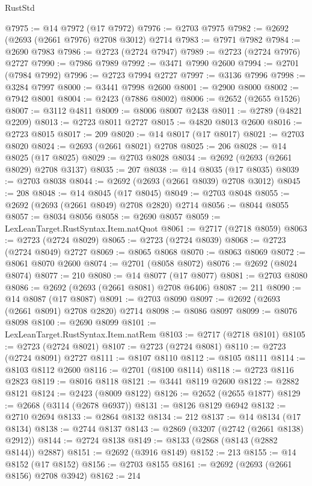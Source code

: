 \begin{lexlean}{RustStd}
\begin{coremodule}
{\begin{coremodule}
{{{{{{{{{{{{{{{{{{{{{{{{{{{{{{{{{{{{{{{@7975 := @14 @7972 (@17 @7972)
@7976 := @2703 @7975
@7982 := @2692 (@2693 (@2661 @7976) @2708 @3012) @2714
@7983 := @7971 @7982
@7984 := @2690 @7983
@7986 := @2723 (@2724 @7947)
@7989 := @2723 (@2724 @7976) @2727
@7990 := @7986 @7989
@7992 := @3471 @7990 @2600
@7994 := @2701 (@7984 @7992)
@7996 := @2723 @7994 @2727
@7997 := @3136 @7996
@7998 := @3284 @7997
@8000 := @3441 @7998 @2600
@8001 := @2900 @8000
@8002 := @7942 @8001
@8004 := @2423 (@7886 @8002)
@8006 := @2652 (@2655 @1526)
@8007 := @3112 @4811
@8009 := @8006 @8007 @2438
@8011 := @2789 (@4821 @2209)
@8013 := @2723 @8011 @2727
@8015 := @4820 @8013 @2600
@8016 := @2723 @8015
@8017 := 209
@8020 := @14 @8017 (@17 @8017)
@8021 := @2703 @8020
@8024 := @2693 (@2661 @8021) @2708
@8025 := 206
@8028 := @14 @8025 (@17 @8025)
@8029 := @2703 @8028
@8034 := @2692 (@2693 (@2661 @8029) @2708 @3137)
@8035 := 207
@8038 := @14 @8035 (@17 @8035)
@8039 := @2703 @8038
@8044 := @2692 (@2693 (@2661 @8039) @2708 @3012)
@8045 := 208
@8048 := @14 @8045 (@17 @8045)
@8049 := @2703 @8048
@8055 := @2692 (@2693 (@2661 @8049) @2708 @2820) @2714
@8056 := @8044 @8055
@8057 := @8034 @8056
@8058 := @2690 @8057
@8059 := LexLeanTarget.RustSyntax.Item.natQuot
@8061 := @2717 (@2718 @8059)
@8063 := @2723 (@2724 @8029)
@8065 := @2723 (@2724 @8039)
@8068 := @2723 (@2724 @8049) @2727
@8069 := @8065 @8068
@8070 := @8063 @8069
@8072 := @8061 @8070 @2600
@8074 := @2701 (@8058 @8072)
@8076 := @2692 (@8024 @8074)
@8077 := 210
@8080 := @14 @8077 (@17 @8077)
@8081 := @2703 @8080
@8086 := @2692 (@2693 (@2661 @8081) @2708 @6406)
@8087 := 211
@8090 := @14 @8087 (@17 @8087)
@8091 := @2703 @8090
@8097 := @2692 (@2693 (@2661 @8091) @2708 @2820) @2714
@8098 := @8086 @8097
@8099 := @8076 @8098
@8100 := @2690 @8099
@8101 := LexLeanTarget.RustSyntax.Item.natRem
@8103 := @2717 (@2718 @8101)
@8105 := @2723 (@2724 @8021)
@8107 := @2723 (@2724 @8081)
@8110 := @2723 (@2724 @8091) @2727
@8111 := @8107 @8110
@8112 := @8105 @8111
@8114 := @8103 @8112 @2600
@8116 := @2701 (@8100 @8114)
@8118 := @2723 @8116 @2823
@8119 := @8016 @8118
@8121 := @3441 @8119 @2600
@8122 := @2882 @8121
@8124 := @2423 (@8009 @8122)
@8126 := @2652 (@2655 @1877)
@8129 := @2668 (@3114 (@2678 @6937))
@8131 := @8126 @8129 @6942
@8132 := @2710 @2694
@8133 := @2864 @8132
@8134 := 212
@8137 := @14 @8134 (@17 @8134)
@8138 := @2744 @8137
@8143 := @2869 (@3207 (@2742 (@2661 @8138) @2912))
@8144 := @2724 @8138
@8149 := @8133 (@2868 (@8143 (@2882 @8144)) @2887)
@8151 := @2692 (@3916 @8149)
@8152 := 213
@8155 := @14 @8152 (@17 @8152)
@8156 := @2703 @8155
@8161 := @2692 (@2693 (@2661 @8156) @2708 @3942)
@8162 := 214
}}}}}}}}}}}}}}}}}}}}}}}}}}}}}}}}}}}}}}}
\end{coremodule}}
\end{coremodule}
\end{lexlean}
